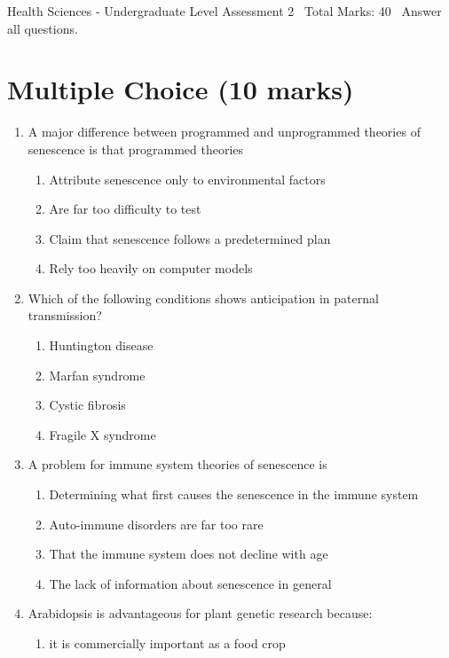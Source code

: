 \documentclass[12pt]{article}
\begin{document}
\begin{center}
Health Sciences - Undergraduate Level Assessment 2 \
Total Marks: 40 \
Answer all questions.
\end{center}

\section*{Multiple Choice (10 marks)}
\begin{enumerate}[label=\arabic*.]
\item A major difference between programmed and unprogrammed theories of senescence is that programmed theories
\begin{enumerate}[label=(\alph*)]
    \item Attribute senescence only to environmental factors
    \item Are far too difficulty to test
    \item Claim that senescence follows a predetermined plan
    \item Rely too heavily on computer models
\end{enumerate}
\item Which of the following conditions shows anticipation in paternal transmission?
\begin{enumerate}[label=(\alph*)]
    \item Huntington disease
    \item Marfan syndrome
    \item Cystic fibrosis
    \item Fragile X syndrome
\end{enumerate}
\item A problem for immune system theories of senescence is
\begin{enumerate}[label=(\alph*)]
    \item Determining what first causes the senescence in the immune system
    \item Auto-immune disorders are far too rare
    \item That the immune system does not decline with age
    \item The lack of information about senescence in general
\end{enumerate}
\item Arabidopsis is advantageous for plant genetic research because:
\begin{enumerate}[label=(\alph*)]
    \item it is commercially important as a food crop

\end{enumerate}
\end{enumerate}
\end{document}
